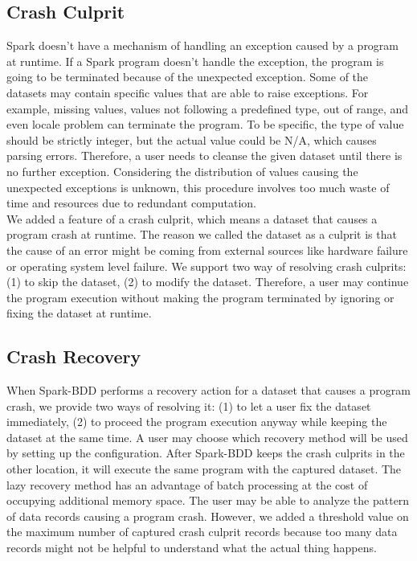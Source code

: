 \documentclass{acm_proc_article-sp}
\begin{document}
\subsection{Crash Culprit}

Spark doesn't have a mechanism of handling an exception caused by a program at runtime. If a Spark program doesn't handle the exception, the program is going to be terminated because of the unexpected exception. Some of the datasets may contain specific values that are able to raise exceptions. For example, missing values, values not following a predefined type, out of range, and even locale problem can terminate the program. To be specific, the type of value should be strictly integer, but the actual value could be N/A, which causes parsing errors. Therefore, a user needs to cleanse the given dataset until there is no further exception. Considering the distribution of values causing the unexpected exceptions is unknown, this procedure involves too much waste of time and resources due to redundant computation.\\
We added a feature of a crash culprit, which means a dataset that causes a program crash at runtime. The reason we called the dataset as a culprit is that the cause of an error might be coming from external sources like hardware failure or operating system level failure. We support two way of resolving crash culprits: (1) to skip the dataset, (2) to modify the dataset. Therefore, a user may continue the program execution without making the program terminated by ignoring or fixing the dataset at runtime.

\subsection{Crash Recovery}

When Spark-BDD performs a recovery action for a dataset that causes a program crash, we provide two ways of resolving it: (1) to let a user fix the dataset immediately, (2) to proceed the program execution anyway while keeping the dataset at the same time. A user may choose which recovery method will be used by setting up the configuration. After Spark-BDD keeps the crash culprits in the other location, it will execute the same program with the captured dataset. The lazy recovery method has an advantage of batch processing at the cost of occupying additional memory space. The user may be able to analyze the pattern of data records causing a program crash. However, we added a threshold value on the maximum number of captured crash culprit records because too many data records might not be helpful to understand what the actual thing happens.
\end{document}
